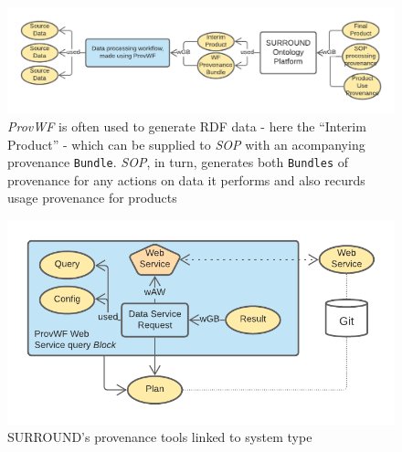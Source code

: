 \documentclass[letterpaper,twocolumn,10pt]{article}
\begin{document}
\begin{figure}
  \begin{center}
    \includegraphics[width=\textwidth]{images/provwf-to-sop.png}
  \end{center}
  \caption{\label{fig:provwf-to-sop} \textit{ProvWF} is often used to generate RDF data - here the ``Interim Product'' - which can be supplied to \textit{SOP} with an acompanying provenance \texttt{Bundle}. \textit{SOP}, in turn, generates both \texttt{Bundles} of provenance for any actions on data it performs and also recurds usage provenance for products}
  \end{figure}

\begin{figure}
  \begin{center}
    \includegraphics[width=\textwidth]{images/data-service.png}
  \end{center}
  \caption{\label{fig:data-service} SURROUND's provenance tools linked to system type}
  \end{figure}
\end{document}
